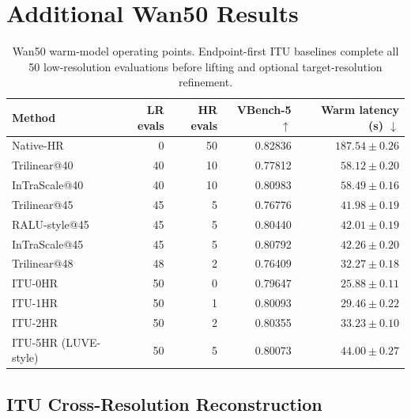 \documentclass[letterpaper]{article}
\begin{document}
\section{Additional Wan50 Results}

\begin{table}[t]
  \centering
  \small
  \setlength{\tabcolsep}{5pt}
  \begin{tabular}{lrrrr}
    \toprule
    Method & LR evals & HR evals & VBench-5 \(\uparrow\) &
    Warm latency (s) \(\downarrow\) \\
    \midrule
    Native-HR & 0 & 50 & 0.82836 & \(187.54\pm0.26\) \\
    Trilinear@40 & 40 & 10 & 0.77812 & \(58.12\pm0.20\) \\
    InTraScale@40 & 40 & 10 & 0.80983 & \(58.49\pm0.16\) \\
    Trilinear@45 & 45 & 5 & 0.76776 & \(41.98\pm0.19\) \\
    RALU-style@45 & 45 & 5 & 0.80440 & \(42.01\pm0.19\) \\
    InTraScale@45 & 45 & 5 & 0.80792 & \(42.26\pm0.20\) \\
    Trilinear@48 & 48 & 2 & 0.76409 & \(32.27\pm0.18\) \\
    ITU-0HR & 50 & 0 & 0.79647 & \(25.88\pm0.11\) \\
    ITU-1HR & 50 & 1 & 0.80093 & \(29.46\pm0.22\) \\
    ITU-2HR & 50 & 2 & 0.80355 & \(33.23\pm0.10\) \\
    ITU-5HR (LUVE-style) & 50 & 5 & 0.80073 & \(44.00\pm0.27\) \\
    \bottomrule
  \end{tabular}
  \caption{Wan50 warm-model operating points.  Endpoint-first ITU baselines
  complete all 50 low-resolution evaluations before lifting and optional
  target-resolution refinement.}
  \label{tab:wan50-full}
\end{table}

\subsection{ITU Cross-Resolution Reconstruction}
\end{document}
